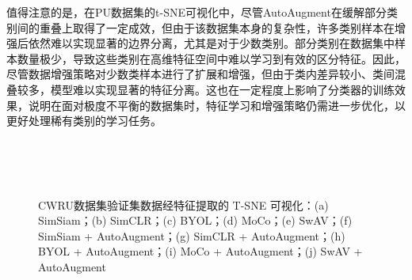 \documentclass[master]{thesis-uestc}
\begin{document}
值得注意的是，在PU数据集的t-SNE可视化中，尽管AutoAugment在缓解部分类别间的重叠上取得了一定成效，但由于该数据集本身的复杂性，许多类别样本在增强后依然难以实现显著的边界分离，尤其是对于少数类别。部分类别在数据集中样本数量极少，导致这些类别在高维特征空间中难以学习到有效的区分特征。因此，尽管数据增强策略对少数类样本进行了扩展和增强，但由于类内差异较小、类间混叠较多，模型难以实现显著的特征分离。这也在一定程度上影响了分类器的训练效果，说明在面对极度不平衡的数据集时，特征学习和增强策略仍需进一步优化，以更好处理稀有类别的学习任务。

\begin{figure}[H]
    \centering
    \\
    \\
    \\
    \caption{CWRU数据集验证集数据经特征提取的 T-SNE 可视化：(a) SimSiam；(b) SimCLR；(c) BYOL；(d) MoCo；(e) SwAV；(f) SimSiam + AutoAugment；(g) SimCLR + AutoAugment；(h) BYOL + AutoAugment；(i) MoCo + AutoAugment；(j) SwAV + AutoAugment}
    \label{tsne_of_all_models}
\end{figure}
\end{document}
